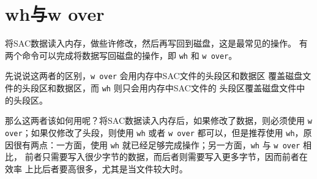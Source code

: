 \section{wh与w over}
\label{sec:wh-and-wover}
将SAC数据读入内存，做些许修改，然后再写回到磁盘，这是最常见的操作。
有两个命令可以完成将数据写回磁盘的操作，即 \texttt{wh} 和 \texttt{w over}。

先说说这两者的区别，\texttt{w over} 会用内存中SAC文件的头段区和数据区
覆盖磁盘文件的头段区和数据区，而 \texttt{wh} 则只会用内存中SAC文件的
头段区覆盖磁盘文件中的头段区。

那么这两者该如何用呢？将SAC数据读入内存后，如果修改了数据，则必须使用
\texttt{w over}；如果仅修改了头段，则使用 \texttt{wh} 或者 \texttt{w over}
都可以，但是推荐使用 \texttt{wh}，原因很有两点：一方面，使用 \texttt{wh}
就已经足够完成操作；另一方面，\texttt{wh} 与 \texttt{w over} 相比，
前者只需要写入很少字节的数据，而后者则需要写入更多字节，因而前者在效率
上比后者要高很多，尤其是当文件较大时。
